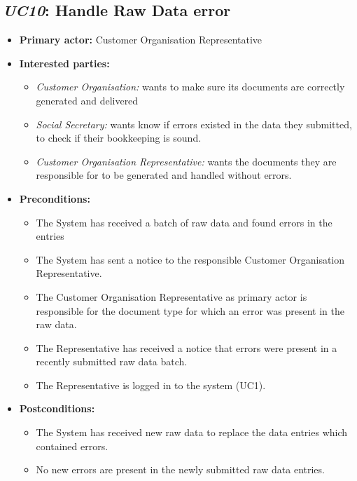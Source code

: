 \documentclass[a4paper,10pt]{article}
\begin{document}
\subsection{\emph{UC10}: Handle Raw Data error}
\begin{itemize}
    \item \textbf{Primary actor:} Customer Organisation Representative
    \item \textbf{Interested parties:} 
        \begin{itemize}
            \item \textit{Customer Organisation:} wants to make sure its documents are correctly generated and delivered
            \item \textit{Social Secretary:} wants know if errors existed in the data they submitted, to check if their bookkeeping is sound.
            \item \textit{Customer Organisation Representative:} wants the documents they are responsible for to be generated and handled without errors.
        \end{itemize}

    \item \textbf{Preconditions:}
        \begin{itemize}
            \item The System has received a batch of raw data and found errors in the entries
            \item The System has sent a notice to the responsible Customer Organisation Representative.
            \item The Customer Organisation Representative as primary actor is responsible for the document type for which an error was present in the raw data.
            \item The Representative has received a notice that errors were present in a recently submitted raw data batch.
            \item The Representative is logged in to the system (UC1).
        \end{itemize}

    \item \textbf{Postconditions:}
        \begin{itemize}
            \item The System has received new raw data to replace the data entries which contained errors.
            \item No new errors are present in the newly submitted raw data entries.
        \end{itemize}
        

\end{itemize}
\end{document}
